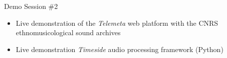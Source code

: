 \documentclass[final, hyperref, table]{beamer}
\begin{document}
\begin{frame}
\begin{columns}
  \begin{block}{Demo Session \#2}
    \begin{itemize}
       \item Live demonstration of the \emph{Telemeta} web platform with
      the CNRS ethnomusicological sound archives
    \item Live demonstration \emph{Timeside} audio processing
      framework (Python)
    \end{itemize}
  \end{block}

\end{columns}
\end{frame}
\end{document}
